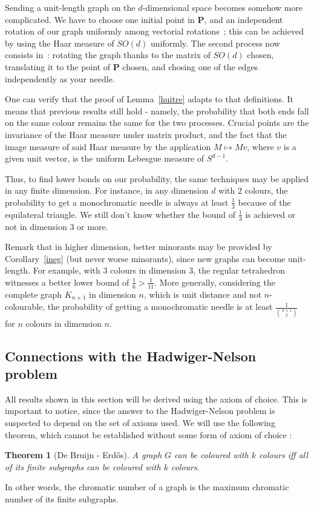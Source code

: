 \documentclass[a4paper,11pt]{article}
\newtheorem{theo}{Theorem}
\theoremstyle{definition}
\theoremstyle{remark}
\begin{document}
Sending a unit-length graph on the $d$-dimensional space becomes somehow more 
complicated. We have to choose one initial point in $ \mathbf{P} $, and an independent 
rotation of our graph uniformly among vectorial rotations~; this can be achieved 
by using the Haar measure of $SO(d)$ uniformly. The second process now consists 
in~: rotating the graph thanks to the matrix of $SO(d)$ chosen, translating it 
to the point of $\mathbf{P}$ chosen, and chosing one of the 
edges independently as your needle.

One can verify that the proof of Lemma~\ref{huitre} adapts to that definitions. 
It means that previous results still hold - namely, the probability that both 
ends fall on the same colour remains the same for the two processes. Crucial 
points are the invariance of the Haar measure under matrix product, and the 
fact that the image measure of said Haar measure by the application 
$M\mapsto Mv$, where $v$ is a given unit vector, is the uniform Lebesgue 
measure of $S^{d-1}$.

Thus, to find lower bonds on our probability, the same techniques may be applied 
in any finite dimension. For instance, in any dimension $d$ with $2$ colours,
the probability to get a monochromatic  
needle is always at least $\frac{1}{3}$ because of the equilateral triangle. 
We still don't know whether the bound of $\frac{1}{3}$ is achieved or not in 
dimension $3$ or more. 

Remark that in higher dimension, better minorants may be provided by 
Corollary~\ref{ineg} (but never worse minorants), since new graphs can 
become unit-length. For example, with $3$ colours in dimension $3$, the regular 
tetrahedron witnesses a better lower bound 
of $\frac 1 6 >\frac 1 {11}$. More generally, considering the complete graph 
$K_{n+1}$ in dimension $n$, which is unit distance and not $n$-colourable, the 
probability of getting a monochromatic needle is at least $\frac{1}{\binom{n+1}{2}}$ 
for $n$ colours in dimension $n$.

\subsection{Connections with the Hadwiger-Nelson problem} \label{hn}
All results shown in this section will be derived using the axiom of choice. 
This is important to notice, since the answer to the Hadwiger-Nelson problem is 
suspected to depend on the set of axioms used. We will use the 
following theorem, which cannot be established without some form of axiom of 
choice :
\begin{theo}[De Bruijn - Erdős]
 A graph $G$ can be coloured with $k$ colours iff all of its finite subgraphs 
 can be coloured with $k$ colours.
\end{theo}
In other words, the chromatic number of a graph is the maximum chromatic number 
of its finite subgraphs.
\end{document}
